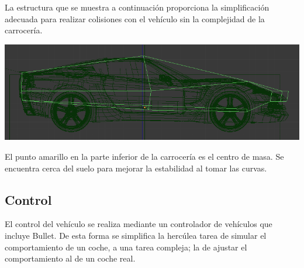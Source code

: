 \documentclass[11pt,a4paper,hidelinks]{article}
\begin{document}
La estructura que se muestra a continuación proporciona la simplificación 
adecuada para realizar colisiones con el vehículo sin la complejidad de la 
carrocería.

\includegraphics[width=\textwidth]{vehiculo-colision}

El punto amarillo en la parte inferior de la carrocería es el centro de masa. Se 
encuentra cerca del suelo para mejorar la estabilidad al tomar las curvas.


\subsection{Control}
El control del vehículo se realiza mediante un controlador de vehículos que 
incluye Bullet. De esta forma se simplifica la hercúlea tarea de simular el 
comportamiento de un coche, a una tarea compleja; la de ajustar el 
comportamiento al de un coche real.
\end{document}
